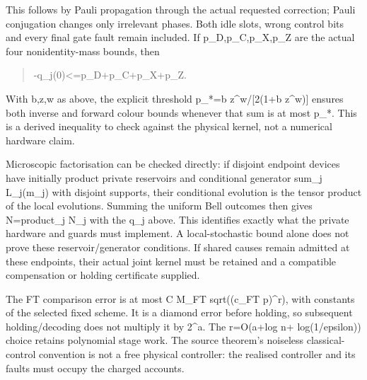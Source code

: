 \documentclass[
]{article}
\begin{document}
This follows by Pauli propagation through the actual requested
correction; Pauli conjugation changes only irrelevant phases. Both idle
slots, wrong control bits and every final gate fault remain included. If
p\allowbreak{}\_\allowbreak{}D\allowbreak{},\allowbreak{}p\allowbreak{}\_\allowbreak{}C\allowbreak{},\allowbreak{}p\allowbreak{}\_\allowbreak{}X\allowbreak{},\allowbreak{}p\allowbreak{}\_\allowbreak{}Z
are the actual four nonidentity-mass bounds, then

\begin{quote}\small\ttfamily\raggedright\setlength{\parskip}{0pt}
\allowbreak{}-\allowbreak{}q\allowbreak{}\_\allowbreak{}j\allowbreak{}(\allowbreak{}0\allowbreak{})\allowbreak{}<\allowbreak{}=\allowbreak{}p\allowbreak{}\_\allowbreak{}D\allowbreak{}+\allowbreak{}p\allowbreak{}\_\allowbreak{}C\allowbreak{}+\allowbreak{}p\allowbreak{}\_\allowbreak{}X\allowbreak{}+\allowbreak{}p\allowbreak{}\_\allowbreak{}Z\allowbreak{}.\par
\end{quote}

With b,z,w as above, the explicit threshold p\_*=b z\^{}w/{[}2(1+b
z\^{}w){]} ensures both inverse and forward colour bounds whenever that
sum is at most p\_*. This is a derived inequality to check against the
physical kernel, not a numerical hardware claim.

Microscopic factorisation can be checked directly: if disjoint endpoint
devices have initially product private reservoirs and conditional
generator sum\_j L\_j(m\_j) with disjoint supports, their conditional
evolution is the tensor product of the local evolutions. Summing the
uniform Bell outcomes then gives N=product\_j N\_j with the q\_j above.
This identifies exactly what the private hardware and guards must
implement. A local-stochastic bound alone does not prove these
r\allowbreak{}e\allowbreak{}s\allowbreak{}e\allowbreak{}r\allowbreak{}v\allowbreak{}o\allowbreak{}i\allowbreak{}r\allowbreak{}/\allowbreak{}g\allowbreak{}e\allowbreak{}n\allowbreak{}e\allowbreak{}r\allowbreak{}a\allowbreak{}t\allowbreak{}o\allowbreak{}r
conditions. If shared causes remain admitted at these endpoints, their
actual joint kernel must be retained and a compatible compensation or
holding certificate supplied.

The FT comparison error is at most C M\_FT sqrt((c\_FT p)\^{}r), with
constants of the selected fixed scheme. It is a diamond error before
holding, so subsequent
h\allowbreak{}o\allowbreak{}l\allowbreak{}d\allowbreak{}i\allowbreak{}n\allowbreak{}g\allowbreak{}/\allowbreak{}d\allowbreak{}e\allowbreak{}c\allowbreak{}o\allowbreak{}d\allowbreak{}i\allowbreak{}n\allowbreak{}g
does not multiply it by 2\^{}a. The r=O(a+log n+
l\allowbreak{}o\allowbreak{}g\allowbreak{}(\allowbreak{}1\allowbreak{}/\allowbreak{}e\allowbreak{}p\allowbreak{}s\allowbreak{}i\allowbreak{}l\allowbreak{}o\allowbreak{}n\allowbreak{})\allowbreak{})
choice retains polynomial stage work. The source theorem's noiseless
classical-control convention is not a free physical controller: the
realised controller and its faults must occupy the charged accounts.
\end{document}

